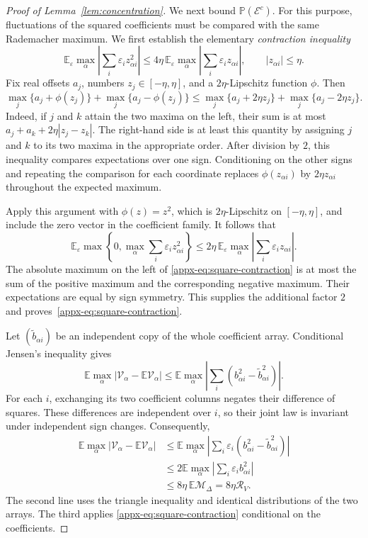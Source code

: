 \documentclass[11pt,letterpaper]{article}
\theoremstyle{remark}
\newcommand{\E}{\mathbb E}
\newcommand{\Pp}{\mathbb P}
\begin{document}
\begin{proof}[Proof of Lemma~\ref{lem:concentration}]
We next bound $\Pp(\mathcal E^c)$. For this purpose, fluctuations
of the squared coefficients must be compared with the same
Rademacher maximum. We first establish the elementary
\emph{contraction inequality}
\begin{equation}
 \E_\varepsilon\max_\alpha
       \left|\sum_i\varepsilon_i z_{\alpha i}^2\right|
 \le4\eta\,\E_\varepsilon\max_\alpha
       \left|\sum_i\varepsilon_i z_{\alpha i}\right|,
 \qquad |z_{\alpha i}|\le\eta.
 \label{appx-eq:square-contraction}
\end{equation}
Fix real offsets $a_j$, numbers $z_j\in[-\eta,\eta]$, and a
$2\eta$-Lipschitz function $\phi$. Then
\[
 \max_j\{a_j+\phi(z_j)\}+\max_j\{a_j-\phi(z_j)\}
 \le\max_j\{a_j+2\eta z_j\}+\max_j\{a_j-2\eta z_j\}.
\]
Indeed, if $j$ and $k$ attain the two maxima on the left, their
sum is at most $a_j+a_k+2\eta|z_j-z_k|$.
The right-hand side is at least this quantity by assigning $j$
and $k$ to its two maxima in the appropriate order.
After division by $2$, this inequality compares expectations over
one sign. Conditioning on the other signs and repeating the
comparison for each coordinate replaces $\phi(z_{\alpha i})$
by $2\eta z_{\alpha i}$ throughout the expected maximum.

Apply this argument with $\phi(z)=z^2$, which is
$2\eta$-Lipschitz on $[-\eta,\eta]$, and include the zero vector
in the coefficient family. It follows that
\[
 \E_\varepsilon\max\left\{0,\max_\alpha
                     \sum_i\varepsilon_i z_{\alpha i}^2\right\}
 \le2\eta\,\E_\varepsilon\max_\alpha
                    \left|\sum_i\varepsilon_i z_{\alpha i}\right|.
\]
The absolute maximum on the left of
\eqref{appx-eq:square-contraction} is at most the sum of the positive
maximum and the corresponding negative maximum. Their expectations
are equal by sign symmetry. This supplies the additional factor
$2$ and proves~\eqref{appx-eq:square-contraction}.

Let $(\widetilde b_{\alpha i})$ be an independent copy of the
whole coefficient array. Conditional Jensen's inequality gives
\[
 \E\max_\alpha|\mathcal V_\alpha-\E\mathcal V_\alpha|
 \le\E\max_\alpha
       \left|\sum_i(b_{\alpha i}^2-\widetilde b_{\alpha i}^2)\right|.
\]
For each $i$, exchanging its two coefficient columns negates their
difference of squares. These differences are independent over $i$,
so their joint law is invariant under independent sign changes.
Consequently,
\[
 \begin{aligned}
 \E\max_\alpha|\mathcal V_\alpha-\E\mathcal V_\alpha|
 &\le\E\max_\alpha\left|\sum_i\varepsilon_i
                  (b_{\alpha i}^2-\widetilde b_{\alpha i}^2)\right|\\
 &\le2\E\max_\alpha\left|\sum_i\varepsilon_i b_{\alpha i}^2\right|\\
 &\le8\eta\,\E\mathcal M_\Delta=8\eta\mathcal R_V.
 \end{aligned}
\]
The second line uses the triangle inequality and identical
distributions of the two arrays. The third applies
\eqref{appx-eq:square-contraction} conditional on the coefficients.


\end{proof}
\end{document}
